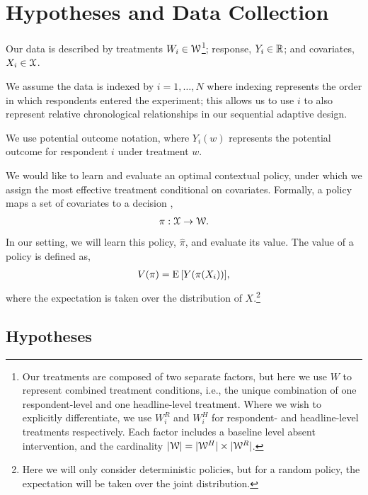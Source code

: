 \documentclass[letterpaper, 12pt, parskip=full,]{scrartcl}
\begin{document}
\section{Hypotheses and Data Collection}



Our data is described by treatments $W_i \in {\EuScript W}$\footnote{Our treatments are composed of two separate factors, but here we use $W$ to represent combined treatment conditions, i.e., the unique combination of one respondent-level and one headline-level treatment. Where we wish to explicitly differentiate, we use $W^R_i$ and $W^H_i$ for respondent- and headline-level treatments respectively. Each factor includes a baseline level absent intervention, and the cardinality $|{\EuScript W}| = |{\EuScript W}^H|\times |{\EuScript W}^R|$.}; response,  $Y_i \in {\mathbb R}$; and covariates, $X_i \in {\EuScript X}$. 

We assume the data is indexed by $i = 1, \dots, N$ where indexing represents the order in which respondents entered the experiment; this allows us to use $i$ to also represent relative chronological relationships in our sequential adaptive design. 

We use potential outcome notation, where $Y_i(w)$ represents the potential outcome for respondent $i$ under treatment $w$.%


We would like to learn and evaluate an optimal contextual policy, under which we assign the most effective treatment conditional on covariates. Formally, a policy maps a set of covariates to a decision \citep{athey2017efficient}, %
\begin{align}
  \pi: {\EuScript X} \rightarrow {\EuScript W}. 
  \label{eq:policy}
\end{align}
In our setting, we will learn this policy, $\hat \pi$, and evaluate its value. The value of a policy is defined as, 
\begin{align}
V(\pi) =  {\textrm E}\,[Y(\pi(X_{i}))],
  \label{eq:policy_value}
\end{align}
where the expectation is taken over the distribution of $X$.\footnote{Here we will only consider deterministic policies, but for a random policy, the expectation will be taken over the joint distribution. }

\subsection{Hypotheses}\label{hypotheses}
\end{document}
